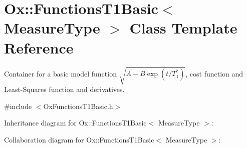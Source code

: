 \hypertarget{class_ox_1_1_functions_t1_basic}{}\section{Ox\+:\+:Functions\+T1\+Basic$<$ Measure\+Type $>$ Class Template Reference}
\label{class_ox_1_1_functions_t1_basic}


Container for a basic model function $\sqrt{A-B\exp(t/T_1^*)}$, cost function and Least-\/\+Squares function and derivatives.  




{\ttfamily \#include $<$Ox\+Functions\+T1\+Basic.\+h$>$}



Inheritance diagram for Ox\+:\+:Functions\+T1\+Basic$<$ Measure\+Type $>$\+:


Collaboration diagram for Ox\+:\+:Functions\+T1\+Basic$<$ Measure\+Type $>$\+:
